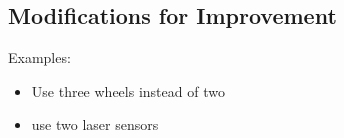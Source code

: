 \documentclass[10pt,journal,compsoc]{IEEEtran}
\begin{document}
\subsection{Modifications for Improvement}
Examples:
\begin{itemize}
\item Use three wheels instead of two
\item use two laser sensors
\end{itemize}







\end{document}
